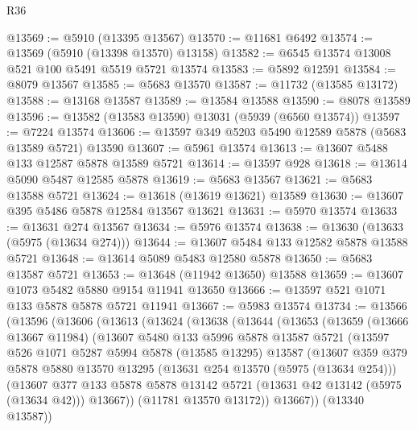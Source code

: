\begin{lexlean}{R36}
\begin{coremodule}
@13569 := @5910 (@13395 @13567)
@13570 := @11681 @6492
@13574 := @13569 (@5910 (@13398 @13570) @13158)
@13582 := @6545 @13574 @13008 @521 @100 @5491 @5519 @5721 @13574
@13583 := @5892 @12591
@13584 := @8079 @13567
@13585 := @5683 @13570
@13587 := @11732 (@13585 @13172)
@13588 := @13168 @13587
@13589 := @13584 @13588
@13590 := @8078 @13589
@13596 := @13582 (@13583 @13590) @13031 (@5939 (@6560 @13574))
@13597 := @7224 @13574
@13606 := @13597 @349 @5203 @5490 @12589 @5878 (@5683 @13589 @5721) @13590
@13607 := @5961 @13574
@13613 := @13607 @5488 @133 @12587 @5878 @13589 @5721
@13614 := @13597 @928
@13618 := @13614 @5090 @5487 @12585 @5878
@13619 := @5683 @13567
@13621 := @5683 @13588 @5721
@13624 := @13618 (@13619 @13621) @13589
@13630 := @13607 @395 @5486 @5878 @12584 @13567 @13621
@13631 := @5970 @13574
@13633 := @13631 @274 @13567
@13634 := @5976 @13574
@13638 := @13630 (@13633 (@5975 (@13634 @274)))
@13644 := @13607 @5484 @133 @12582 @5878 @13588 @5721
@13648 := @13614 @5089 @5483 @12580 @5878
@13650 := @5683 @13587 @5721
@13653 := @13648 (@11942 @13650) @13588
@13659 := @13607 @1073 @5482 @5880 @9154 @11941 @13650
@13666 := @13597 @521 @1071 @133 @5878 @5878 @5721 @11941
@13667 := @5983 @13574
@13734 := @13566
    (@13596
      (@13606
        (@13613
          (@13624
            (@13638
              (@13644
                (@13653
                  (@13659
                    (@13666 @13667 @11984)
                    (@13607
                      @5480
                      @133
                      @5996
                      @5878
                      @13587
                      @5721
                      (@13597
                        @526
                        @1071
                        @5287
                        @5994
                        @5878
                        (@13585 @13295)
                        @13587
                        (@13607
                          @359
                          @379
                          @5878
                          @5880
                          @13570
                          @13295
                          (@13631 @254 @13570 (@5975 (@13634 @254)))
                          (@13607
                            @377
                            @133
                            @5878
                            @5878
                            @13142
                            @5721
                            (@13631 @42 @13142 (@5975 (@13634 @42)))
                            @13667))
                        (@11781 @13570 @13172))
                      @13667))
                  (@13340 @13587))

\end{coremodule}
\end{lexlean}

